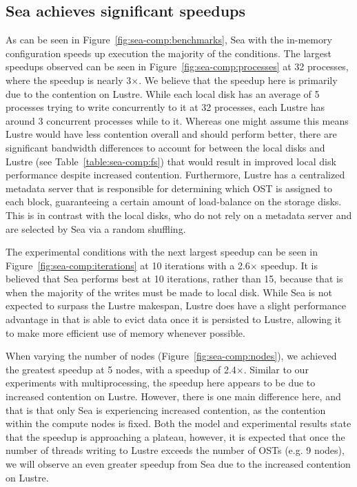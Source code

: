       \subsection{Sea achieves significant speedups}

      As can be seen in Figure~\ref{fig:sea-comp:benchmarks}, Sea with the
      in-memory configuration speeds up execution the majority of the
      conditions. The largest speedups observed can be seen in
      Figure~\ref{fig:sea-comp:processes} at 32 processes, where the speedup is
      nearly 3$\times$. We believe that the speedup here is primarily due to the
      contention on Lustre. While each local disk has an average of 5 processes
      trying to write concurrently to it at 32 processes, each Lustre has around
      3 concurrent processes while to it. Whereas one might assume this means
      Lustre would have less contention overall and should perform better, there
      are significant bandwidth differences to account for between the local
      disks and Lustre (see Table~\ref{table:sea-comp:fs}) that would result in
      improved local disk performance despite increased contention. Furthermore,
      Lustre has a centralized metadata server that is responsible for
      determining which OST is assigned to each block, guaranteeing a certain
      amount of load-balance on the storage disks. This is in contrast with the
      local disks, who do not rely on a metadata server and are selected by Sea
      via a random shuffling.

      The experimental conditions with the next largest speedup can be seen in
      Figure~\ref{fig:sea-comp:iterations} at 10 iterations with a 2.6$\times$
      speedup. It is believed that Sea performs best at 10 iterations, rather
      than 15, because that is when the majority of the writes must be made to
      local disk. While Sea is not expected to surpass the Lustre makespan,
      Lustre does have a slight performance advantage in that is able to evict
      data once it is persisted to Lustre, allowing it to make more efficient
      use of memory whenever possible. 

      When varying the number of nodes (Figure~\ref{fig:sea-comp:nodes}), we
      achieved the greatest speedup at 5 nodes, with a speedup of 2.4$\times$.
      Similar to our experiments with multiprocessing, the speedup here appears
      to be due to increased contention on Lustre. However, there is one main
      difference here, and that is that only Sea is experiencing increased
      contention, as the contention within the compute nodes is fixed. Both the
      model and experimental results state that the speedup is approaching a
      plateau, however, it is expected that once the number of threads writing
      to Lustre exceeds the number of OSTs (e.g. 9 nodes), we will observe an
      even greater speedup from Sea due to the increased contention on Lustre.

